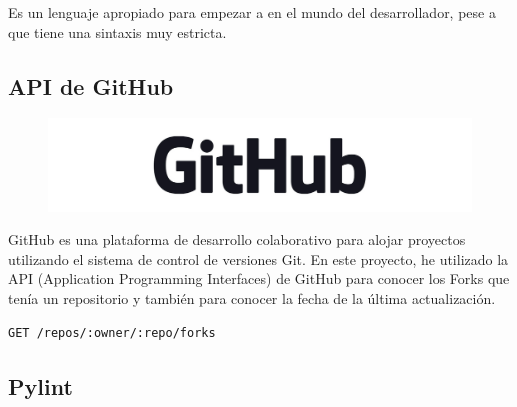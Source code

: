 \documentclass[a4paper, 12pt]{book}
\begin{document}
Es un lenguaje apropiado para empezar a en el mundo del desarrollador, pese a que tiene una sintaxis muy estricta.

\subsection{API de GitHub}
\begin{figure}[hbtp]
\centering
\includegraphics[scale=0.2]{img/githublogo.jpg} 
\end{figure}

GitHub es una plataforma de desarrollo colaborativo para alojar proyectos utilizando el sistema de control de versiones Git.
En este proyecto, he utilizado la API (Application Programming Interfaces) de GitHub para conocer los Forks que tenía un repositorio y también para conocer la fecha de la última actualización.
\begin{lstlisting}[frame=single]
GET /repos/:owner/:repo/forks
\end{lstlisting}


\subsection{Pylint}
\end{document}
